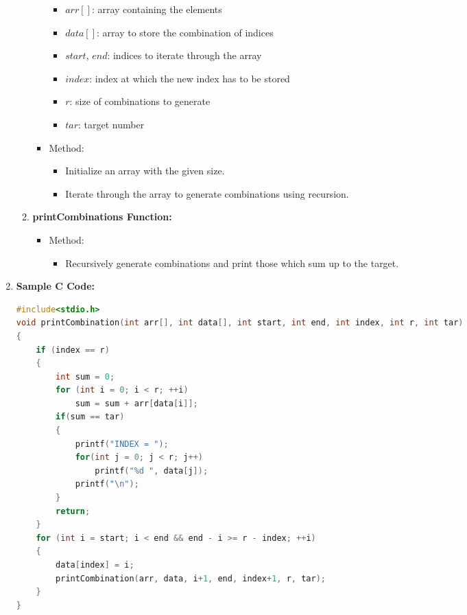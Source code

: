 \begin{enumerate}
\begin{enumerate}
\begin{itemize}
            \begin{itemize}
                \item \(arr[]\): array containing the elements
                \item \(data[]\): array to store the combination of indices
                \item \(start\), \(end\): indices to iterate through the array
                \item \(index\): index at which the new index has to be stored
                \item \(r\): size of combinations to generate
                \item \(tar\): target number
            \end{itemize}
            
            \item Method:
            
            \begin{itemize}
                \item Initialize an array with the given size.
                \item Iterate through the array to generate combinations using recursion.
            \end{itemize}
        \end{itemize}
        
        \item \textbf{printCombinations Function:}
        
        \begin{itemize}
            \item Method:
            
            \begin{itemize}
                \item Recursively generate combinations and print those which sum up to the target.
            \end{itemize}
        \end{itemize}
    \end{enumerate}
    
    \item \textbf{Sample C Code:}
    
\begin{lstlisting}[language=C]
#include<stdio.h>
void printCombination(int arr[], int data[], int start, int end, int index, int r, int tar) 
{
    if (index == r) 
    {
    	int sum = 0;
        for (int i = 0; i < r; ++i)
        	sum = sum + arr[data[i]];
        if(sum == tar)
        {
        	printf("INDEX = ");
			for(int j = 0; j < r; j++)
				printf("%d ", data[j]);
			printf("\n");
        }
        return;
    }
    for (int i = start; i < end && end - i >= r - index; ++i) 
    {
        data[index] = i;
        printCombination(arr, data, i+1, end, index+1, r, tar);
    }
}


\end{lstlisting}
\end{enumerate}
